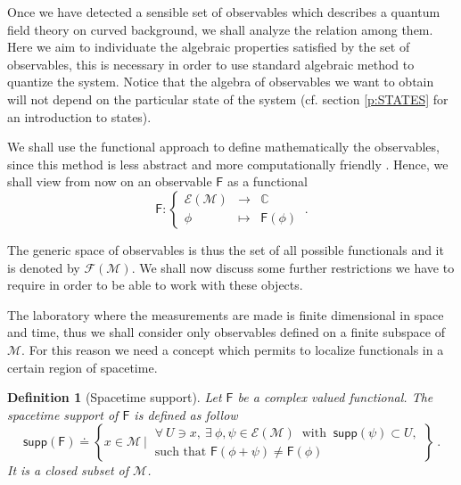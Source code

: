 \documentclass[11pt]{book}
\newcommand{\supp}{\mathsf{supp}}
\newcommand{\Ecal}{\mathcal{E}}
\newcommand{\Fcal}{\mathcal{F}}
\newcommand{\Mcal}{\mathcal{M}}
\newcommand{\Cbb}{\mathbb{C}}
\newcommand{\Fsf}{\mathsf{F}}
\theoremstyle{break}
\newtheorem{definition}{Definition}[chapter]
\begin{document}
Once we have detected a sensible set of observables which describes a quantum field theory on curved background, we shall analyze the relation among them. Here we aim to individuate the algebraic properties satisfied by the set of observables, this is necessary in order to use standard algebraic method to quantize the system. Notice that the algebra of observables we want to obtain will not depend on the particular state of the system (cf. section \ref{p:STATES} for an introduction to states).


We shall use the functional approach to define mathematically the observables, since this method is less abstract and more computationally friendly \cite{brunetti_algebraic_2012,brunetti_perturbative_2009}. Hence, we shall view from now on an observable $\Fsf$ as a functional 
%
\begin{equation*}
\Fsf : \left\{
\begin{array}{ccc}
\Ecal(\Mcal) & \to     & \Cbb \\
\phi  & \mapsto & \Fsf(\phi)
\end{array}
\right. \ . 
\end{equation*}


The generic space of observables is thus the set of all possible functionals and it is denoted by $\Fcal(\Mcal)$. We shall now discuss some further restrictions we have to require in order to be able to work with these objects.


The laboratory where the measurements are made is finite dimensional in space and time, thus we shall consider only observables defined on a finite subspace of $\Mcal$. For this reason we need a concept which permits to localize functionals in a certain region of spacetime.


\begin{definition}[Spacetime support] \label{def:spacetime_supp}
Let $\Fsf$ be a complex valued functional. The spacetime support of $\Fsf$ is defined as follow
%
\begin{equation*}
\supp(\Fsf) \doteq \left\{ x \in \Mcal \ \bigg| \ 
\begin{array}{l}
\forall \ U \ni x , \ \exists \ \phi, \psi \in \Ecal(\Mcal) \ \mbox{ with } \ \supp(\psi) \subset U, \\
\mbox{such that } \Fsf(\phi + \psi) \neq \Fsf(\phi)
\end{array}
\right\} \ .
\end{equation*}
It is a closed subset of $\Mcal$.
%
\end{definition}
\end{document}
